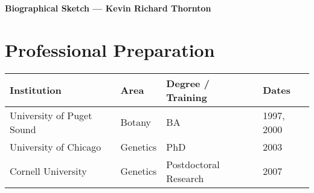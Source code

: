 \documentclass[10pt]{article}
\begin{document}
\begin{center}
		\sf\textbf{{Biographical Sketch --- Kevin Richard Thornton}}
\end{center}



\section{Professional Preparation}

\begin{tabular}{l l l l}
Institution    \hspace{52mm}              &   Area  \hspace{10mm}     & Degree / Training  \hspace{13mm}    & Dates \\
\hline
University of Puget Sound & Botany & BA& 1997, 2000 \\
University of Chicago & Genetics & PhD & 2003\\
Cornell University & Genetics & Postdoctoral Research & 2007 \\
\end{tabular}
\end{document}
